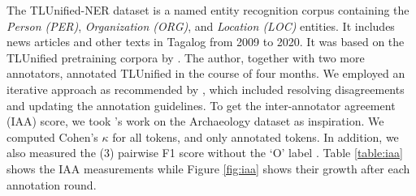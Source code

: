 \documentclass[11pt]{article}
\begin{document}
The TLUnified-NER dataset is a named entity recognition corpus containing the \textit{Person (PER)}, \textit{Organization (ORG)}, and \textit{Location  (LOC)} entities.
It includes news articles and other texts in Tagalog from 2009 to 2020.
It was based on the TLUnified pretraining corpora by \cite{Cruz2021ImprovingLL}.
The author, together with two more annotators, annotated TLUnified in the course of four months.
We employed an iterative approach as recommended by \citet{Reiter2017HT}, which included resolving disagreements and updating the annotation guidelines.
To get the inter-annotator agreement (IAA) score, we took \citet{Brandsen2020CreatingAD}'s work on the Archaeology dataset as inspiration.
We computed Cohen's $\kappa$ for all tokens, and only annotated tokens.  
In addition, we also measured the (3) pairwise F1 score without the `O' label \citep{Deleger2012BG}.
Table \ref{table:iaa} shows the IAA measurements while Figure \ref{fig:iaa} shows their growth after each annotation round.
\end{document}
